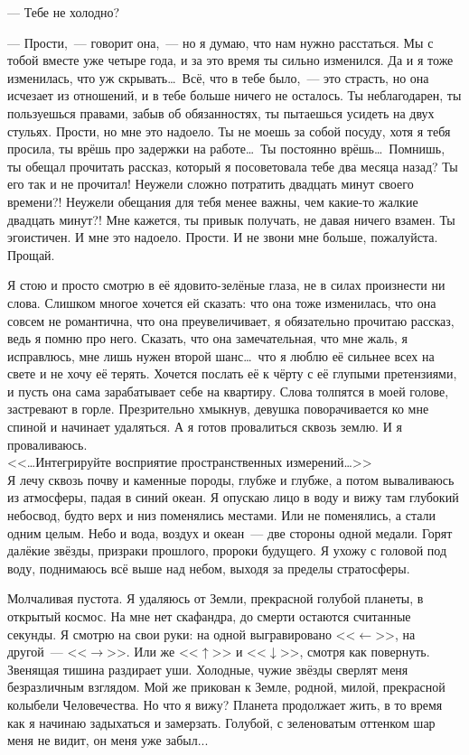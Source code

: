 \documentclass[openany, oneside]{book}
\begin{document}

--- Тебе не холодно?

--- Прости,~--- говорит она,~--- но я думаю, что нам нужно расстаться. Мы с тобой вместе уже четыре года, и за это время ты сильно изменился. Да и я тоже изменилась, что уж скрывать\dots \ Всё, что в тебе было,~--- это страсть, но она исчезает из отношений, и в тебе больше ничего не осталось. Ты неблагодарен, ты пользуешься правами, забыв об обязанностях, ты пытаешься усидеть на двух стульях. Прости, но мне это надоело. Ты не моешь за собой посуду, хотя я тебя просила, ты врёшь про задержки на работе\dots \ Ты постоянно врёшь\dots \ Помнишь, ты обещал прочитать рассказ, который я посоветовала тебе два месяца назад? Ты его так и не прочитал! Неужели сложно потратить двадцать минут своего времени?! Неужели обещания для тебя менее важны, чем какие-то жалкие двадцать минут?! Мне кажется, ты привык получать, не давая ничего взамен. Ты эгоистичен. И мне это надоело. Прости. И не звони мне больше, пожалуйста. Прощай.

Я стою и просто смотрю в её ядовито-зелёные глаза, не в силах произнести ни слова. Слишком многое хочется ей сказать: что она тоже изменилась, что она совсем не романтична, что она преувеличивает, я обязательно прочитаю рассказ, ведь я помню про него. Сказать, что она замечательная, что мне жаль, я исправлюсь, мне лишь нужен второй шанс\dots \ что я люблю её сильнее всех на свете и не хочу её терять. Хочется послать её к чёрту с её глупыми претензиями, и пусть она сама зарабатывает себе на квартиру. Слова толпятся в моей голове, застревают в горле. Презрительно хмыкнув, девушка поворачивается ко мне спиной и начинает удаляться. А я готов провалиться сквозь землю. И я проваливаюсь.\\

<<\dots Интегрируйте восприятие пространственных измерений\dots>>\\

Я лечу сквозь почву и каменные породы, глубже и глубже, а потом вываливаюсь из атмосферы, падая в синий океан. Я опускаю лицо в воду и вижу там глубокий небосвод, будто верх и низ поменялись местами. Или не поменялись, а стали одним целым. Небо и вода, воздух и океан~--- две стороны одной медали. Горят далёкие звёзды, призраки прошлого, пророки будущего. Я ухожу с головой под воду, поднимаюсь всё выше над небом, выходя за пределы стратосферы.

Молчаливая пустота. Я удаляюсь от Земли, прекрасной голубой планеты, в открытый космос. На мне нет скафандра, до смерти остаются считанные секунды. Я смотрю на свои руки: на одной выгравировано <<$\leftarrow$>>, на другой~--- <<$\rightarrow$>>. Или же <<$\uparrow$>> и <<$\downarrow$>>, смотря как повернуть. Звенящая тишина раздирает уши. Холодные, чужие звёзды сверлят меня безразличным взглядом. Мой же прикован к Земле, родной, милой, прекрасной колыбели Человечества. Но что я вижу? Планета продолжает жить, в то время как я начинаю задыхаться и замерзать. Голубой, с зеленоватым оттенком шар меня не видит, он меня уже забыл...
\end{document}
